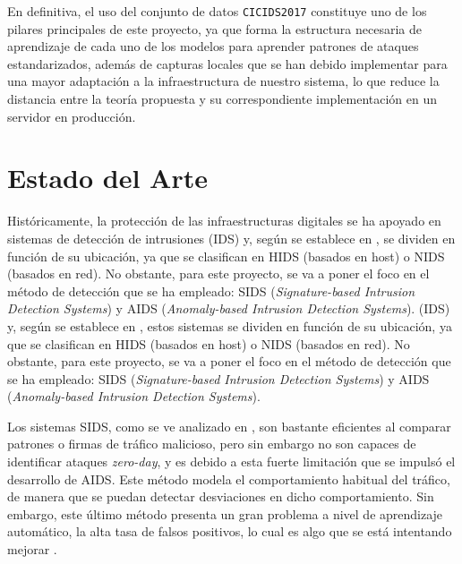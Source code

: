 \documentclass[12pt]{article}
\numberwithin{equation}{section} %
\begin{document}
    \vspace{5mm}

    En definitiva, el uso del conjunto de datos \texttt{CICIDS2017} constituye uno de los pilares principales de este proyecto, ya que forma la estructura necesaria de aprendizaje de cada uno de los modelos para aprender patrones de ataques estandarizados, además de capturas locales que se han debido implementar para una mayor adaptación a la infraestructura de nuestro sistema, lo que reduce la distancia entre la teoría propuesta y su correspondiente implementación en un servidor en producción.

    \vspace{10mm}





    \newpage
    \thispagestyle{empty}
    \mbox{}

    \section{Estado del Arte}

    \vspace{5mm}

    Históricamente, la protección de las infraestructuras digitales se ha apoyado en sistemas de detección de intrusiones (IDS) y, según se establece en \cite{garcia2009anomaly}, se dividen en función de su ubicación, ya que se clasifican en HIDS (basados en host) o NIDS (basados en red). No obstante, para este proyecto, se va a poner el foco en el método de detección que se ha empleado: SIDS (\textit{Signature-based Intrusion Detection Systems}) y AIDS (\textit{Anomaly-based Intrusion Detection Systems}). (IDS) y, según se establece en \cite{garcia2009anomaly}, estos sistemas se dividen en función de su ubicación, ya que se clasifican en HIDS (basados en host) o NIDS (basados en red). No obstante, para este proyecto, se va a poner el foco en el método de detección que se ha empleado: SIDS (\textit{Signature-based Intrusion Detection Systems}) y AIDS (\textit{Anomaly-based Intrusion Detection Systems}).

    \vspace{5mm}

    Los sistemas SIDS, como se ve analizado en \cite{liao2013intrusion}, son bastante eficientes al comparar patrones o firmas de tráfico malicioso, pero sin embargo no son capaces de identificar ataques \textit{zero-day}, y es debido a esta fuerte limitación que se impulsó el desarrollo de AIDS. Este método modela el comportamiento habitual del tráfico, de manera que se puedan detectar desviaciones en dicho comportamiento. Sin embargo, este último método presenta un gran problema a nivel de aprendizaje automático, la alta tasa de falsos positivos, lo cual es algo que se está intentando mejorar \cite{buczak2016survey}.
\end{document}
